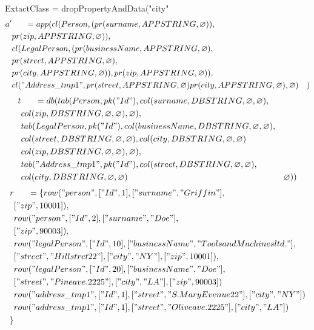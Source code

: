 \documentclass[11pt]{article}
\begin{document}
\newpage
ExtactClass = dropPropertyAndData("city"
\begin{align*}
a' & \;\;\;\;\;\; =app(cl(Person, (pr(surname, APPSTRING, \varnothing)), \\
& pr(zip, APPSTRING, \varnothing)), \\
& cl(LegalPerson, (pr(businessName, APPSTRING, \varnothing), \\
& pr(street, APPSTRING, \varnothing), \\
& pr(city, APPSTRING, \varnothing)), pr(zip, APPSTRING, \varnothing)), \\
& cl("Address\_tmp1", pr(street, APPSTRING, \varnothing) pr(city, APPSTRING, \varnothing) , \varnothing)
& )
\end{align*}
\begin{align*}
t & \;\;\;\;\;\; =db(tab(Person, pk("Id"), col(surname, DBSTRING, \varnothing, \varnothing), \\
& col(zip, DBSTRING, \varnothing, \varnothing), \varnothing), \\
& tab(LegalPerson, pk("Id"),  col(businessName, DBSTRING, \varnothing, \varnothing), \\
& col(street, DBSTRING, \varnothing, \varnothing), col(city, DBSTRING, \varnothing, \varnothing) \\
& col(zip, DBSTRING, \varnothing, \varnothing), \varnothing), \\
& tab("Address\_tmp1", pk("Id"), col(street, DBSTRING, \varnothing, \varnothing),\\
& col(city, DBSTRING, \varnothing, \varnothing)
& \varnothing)) 
\end{align*}
\begin{align*}
r & \;\;\;\;\;\; =\{ row("person", ["Id", 1], ["surname", "Griffin"], \\
& ["zip", 10001]), \\
& row("person", ["Id", 2], ["surname", "Doe"], \\
& ["zip", 90003]), \\
& row("legalPerson", ["Id", 10], ["businessName", "Tools and Machines ltd."], \\
& ["street", "Hill stret 22"], ["city", "NY"], ["zip", 10001]), \\
& row("legalPerson", ["Id", 20], ["businessName", "Doe"], \\
& ["street", "Pine ave. 2225"], ["city", "LA"], ["zip", 90003])\\
& row("address\_tmp1", ["Id", 1], ["street", "S. Mary Evenue 22"], ["city", "NY"]) \\
& row("address\_tmp1", ["Id", 1], ["street", "Olive ave. 2225"], ["city", "LA"] )\\
\}
\end{align*}
\end{document}
